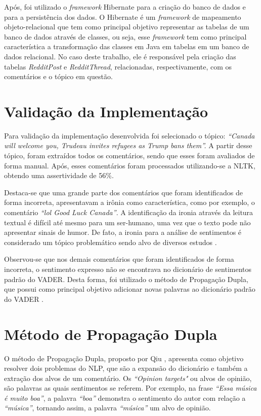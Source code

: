Após, foi utilizado o \textit{framework} Hibernate
\cite{Iverson:2004:HJD:1044870} para a criação do banco de dados e para a
persistência dos dados. O Hibernate é um \textit{framework} de
mapeamento objeto-relacional que tem como principal objetivo 
representar as tabelas de um banco de dados através de classes, ou seja, esse \textit{framework} tem como principal
característica a transformação das classes em Java em tabelas em um banco de
dados relacional.
No caso deste trabalho, ele é responsável pela criação das tabelas \textit{RedditPost} e
\textit{RedditThread}, relacionadas, respectivamente, com os comentários e o
tópico em questão. 

\section{Validação da Implementação}

Para validação da implementação desenvolvida foi selecionado o tópico:
\textit{``Canada will welcome you, Trudeau invites refugees as Trump bans
them''.}
A partir desse tópico, foram extraídos todos os comentários, sendo que
esses foram avaliados de forma manual. Após, esses comentários foram processados
utilizando-se a \ac{NLTK}, obtendo uma assertividade de 56\%.

Destaca-se que uma grande parte dos comentários que foram identificados de forma
incorreta, apresentavam a irônia como característica, como por exemplo, o
comentário \textit{``lol Good Luck Canada''}. A identificação da ironia através
da leitura textual é difícil até mesmo para um ser-humano, uma vez que o
texto pode não apresentar sinais de humor. De fato, a ironia para a análise de
sentimentos é considerado um tópico problemático sendo alvo de diversos estudos \cite{DBLP:conf/lrec/StranisciBFP16}.

Observou-se que nos demais comentários que foram identificados de forma
incorreta, o sentimento expresso não se encontrava no dicionário de
sentimentos padrão do \ac{VADER}. Desta forma, foi
utilizado o método de Propagação Dupla, que possui como principal objetivo
adicionar novas palavras ao dicionário
padrão do \ac{VADER} \cite{Qiu:2011:OWE:1970420.1970422}.

\section{Método de Propagação Dupla}

O método de Propagação Dupla, proposto por Qiu
\cite{Qiu:2011:OWE:1970420.1970422}, apresenta como objetivo resolver dois
problemas do \ac{NLP}, que são a expansão do dicionário e também a extração dos
alvos de um comentário. Os \textit{``Opinion targets"} ou alvos de opinião, são
palavras as quais sentimentos se referem. Por exemplo, na frase \textit{``Essa
música é muito boa''}, a palavra \textit{``boa''} demonstra o sentimento do
autor com relação a \textit{``música''}, tornando assim, a palavra
\textit{``música''} um alvo de opinião.


